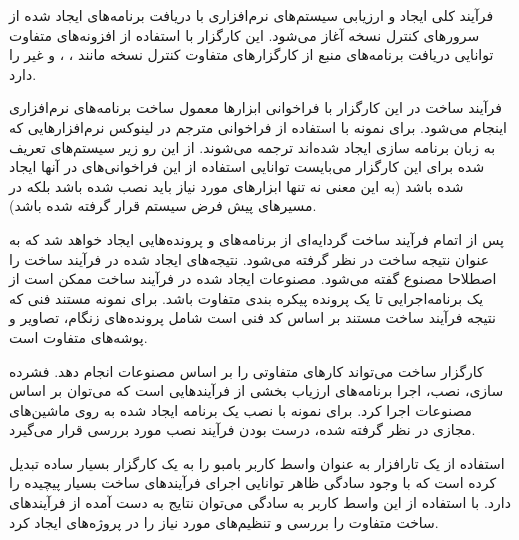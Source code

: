 فرآیند کلی ایجاد و ارزیابی سیستم‌های نرم‌افزاری با دریافت برنامه‌های ایجاد شده
از سرورهای کنترل نسخه آغاز می‌شود. این کارگزار با استفاده از افزونه‌های متفاوت
توانایی دریافت برنامه‌های منبع از کارگزارهای متفاوت کنترل نسخه مانند ،
،  و غیر را دارد.

فرآیند ساخت در این کارگزار با فراخوانی ابزارها معمول ساخت برنامه‌های نرم‌افزاری
اینجام می‌شود. برای نمونه با استفاده از فراخوانی مترجم  در لینوکس
نرم‌افزارهایی که به زبان برنامه سازی  ایجاد شده‌اند ترجمه می‌شوند. از
این رو زیر سیستم‌های تعریف شده برای این کارگزار می‌بایست توانایی استفاده از این
فراخوانی‌های در آنها ایجاد شده باشد (به این معنی  نه تنها ابزارهای مورد نیاز
باید نصب شده باشد بلکه در مسیرهای پیش فرض سیستم قرار گرفته شده باشد).

پس از اتمام فرآیند ساخت گردایه‌ای از برنامه‌های و پرونده‌هایی ایجاد خواهد شد که
به عنوان نتیجه ساخت در نظر گرفته می‌شود. نتیجه‌های ایجاد شده در فرآیند ساخت را
اصطلاحا مصنوع گفته می‌شود. مصنوعات ایجاد شده در فرآیند
ساخت ممکن است از یک برنامه‌اجرایی تا یک پرونده پیکره بندی متفاوت باشد. برای
نمونه مستند فنی که نتیجه فرآیند ساخت مستند بر اساس کد فنی است شامل پرونده‌های
زنگام، تصاویر و پوشه‌های متفاوت است.

کارگزار ساخت می‌تواند کارهای متفاوتی را بر اساس مصنوعات انجام دهد. فشرده سازی،
نصب، اجرا برنامه‌های ارزیاب بخشی از فرآیندهایی است که می‌توان بر اساس مصنوعات
اجرا کرد. برای نمونه با نصب یک برنامه ایجاد شده به روی ماشین‌های مجازی در نظر
گرفته شده، درست بودن فرآیند نصب مورد بررسی قرار می‌گیرد.

استفاده از یک تارافزار به عنوان واسط کاربر بامبو را به یک کارگزار بسیار ساده
تبدیل کرده است که با وجود سادگی ظاهر توانایی اجرای فرآیندهای ساخت بسیار پیچیده
را دارد. با استفاده از این واسط کاربر به سادگی می‌توان نتایج به دست آمده از
فرآیندهای ساخت متفاوت را بررسی و تنظیم‌های مورد نیاز را در پروژه‌های ایجاد کرد.
 
